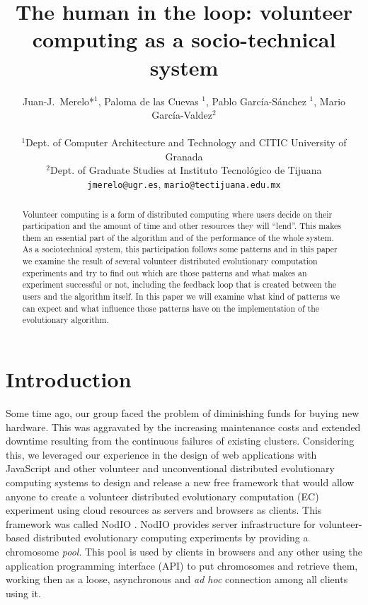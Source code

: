 \documentclass[letterpaper]{article}
\title{The human in the loop: volunteer computing as a socio-technical
system}
\author{Juan-J.~Merelo*$^1$, Paloma de las Cuevas $^1$, Pablo
  Garc\'ia-S\'anchez $^1$, Mario Garc\'ia-Valdez$^2$\\
\mbox{}\\
$^1$Dept. of Computer Architecture and Technology and CITIC University of Granada \\
$^2$Dept. of Graduate Studies at Instituto Tecnol\'ogico de Tijuana \\
{\tt jmerelo@ugr.es}, {\tt mario@tectijuana.edu.mx}}
\begin{document}
\maketitle

\begin{abstract}
Volunteer computing is a form of distributed computing where users
decide on their participation and the amount of time and other resources they will
``lend''. This makes them an essential part of the algorithm and of
the performance of the whole system. As a sociotechnical system, this
participation follows some patterns and in this paper we examine the
result of several volunteer distributed evolutionary computation
experiments and try to find out which are those patterns and what
makes an experiment successful or not, including the feedback loop
that is created between the users and the algorithm itself. In this
paper we will examine what kind of patterns we can expect and what
influence those patterns have on the implementation of the
evolutionary algorithm. 
\end{abstract}

\section{Introduction}
\label{introduction}

Some time ago, our group faced the problem of diminishing funds for
buying new hardware. This was aggravated by the increasing maintenance
costs and extended downtime resulting from the continuous failures of
existing clusters.  Considering this, we leveraged our experience in
the design of web applications with JavaScript and other volunteer and
unconventional distributed evolutionary computing systems to design
and release a new free framework that would allow anyone to create a
volunteer distributed evolutionary computation (EC) experiment using
cloud resources as servers and browsers as clients. This framework was
called NodIO \citep{2016arXiv160101607M}. NodIO provides server
infrastructure for volunteer-based distributed evolutionary computing
experiments by providing a chromosome {\em pool}. This pool is used by
clients in browsers and any other using the application programming
interface (API) to put chromosomes and retrieve them, working then as
a loose, asynchronous and {\em ad hoc} connection among all clients
using it. 
\end{document}
